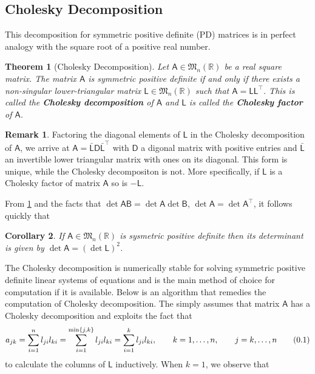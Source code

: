 \documentclass[10pt]{article}
\newtheorem{thm}{Theorem}[section]
\newtheorem{cor}[thm]{Corollary}
\theoremstyle{definition}
\newtheorem*{rem}{Remark}
\newcommand\eqnum{\addtocounter{equation}{1}\tag{\arabic{section}.\arabic{equation}}}
\begin{document}
\subsection{Cholesky Decomposition}
This decomposition for symmetric positive definite (PD) matrices is in perfect analogy with the square root of a positive real number.
\begin{thm}[Cholesky Decomposition]\label{thm:chol}
Let $\mathsf{A} \in \mathfrak{M}_n(\mathbb{R})$ be a real square matrix. The matrix $\mathsf{A}$ is symmetric positive definite if and only if there exists a non-singular lower-triangular matrix $\mathsf{L}\in \mathfrak{M}_n(\mathbb{R})$ such that $\mathsf{A}=\mathsf{L} \mathsf{L}^{\top}$. This is called the \textbf{Cholesky decomposition} of $\mathsf{A}$ and $\mathsf{L}$ is called the \textbf{Cholesky factor} of $\mathsf{A}$.
\end{thm}
\begin{rem}
Factoring the diagonal elements of $\mathsf{L}$ in the Cholesky decomposition of $\mathsf{A}$, we arrive at $\mathsf{A}=\bar{\mathsf{L}}\mathsf{D}\bar{\mathsf{L}}^\top$ with $\mathsf{D}$ a digonal matrix with positive entries and $\bar{\mathsf{L}}$ an invertible lower triangular matrix with ones on its diagonal. This form is unique, while the Cholesky decompositon is not. More specifically, if $\mathsf{L}$ is a Cholesky factor of matrix $\mathsf{A}$ so is $-\mathsf{L}$.
\end{rem}
From \cref{thm:chol} and the facts that $\det\mathsf{A}\mathsf{B}=\det\mathsf{A}\det\mathsf{B}$, $\det\mathsf{A}=\det\mathsf{A}^\top$, it follows quickly that
\begin{cor}
If $\mathsf{A} \in \mathfrak{M}_n(\mathbb{R})$  is sysmetric positive definite then its determinant is given by $\det\mathsf{A} = (\det\mathsf{L})^2 $.
\end{cor}
The Cholesky decomposition is numerically stable for solving symmetric positive definite linear systems of equations and is the main method of choice for computation if it is available. Below is an algorithm that remedies the computation of Cholesky decomposition. The  simply assumes that matrix $\mathsf{A}$ has a Cholesky decomposition and exploits the fact that
\begin{equation*}
a_{jk}  = \sum_{i=1}^{n}l_{ji}l_{ki} = 
\sum_{i=1}^{\min\{j, k\}}l_{ji}l_{ki} = 
\sum_{i=1}^{k}l_{ji}l_{ki}, 
\qquad k=1,\dots, n, \qquad j = k,\dots, n
\eqnum
\label{eq:chol}
\end{equation*}
to calculate the columns of $\mathsf{L}$ inductively. When $k=1$, we observe that 
\end{document}
